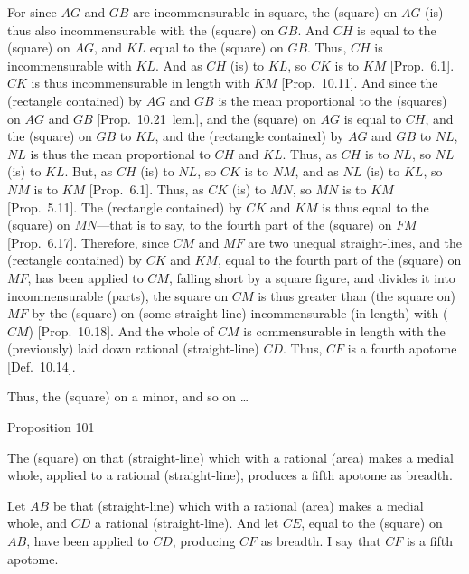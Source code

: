 For since $AG$ and $GB$ are incommensurable in square, the (square)
on $AG$ (is) thus also incommensurable with the (square) on $GB$.
And $CH$ is equal to the (square) on $AG$, and $KL$ equal to the (square) on $GB$. Thus, $CH$ is incommensurable with $KL$. And as $CH$ (is) to
$KL$, so $CK$ is to $KM$ [Prop.~6.1]. 
$CK$ is thus incommensurable in length with $KM$ [Prop.~10.11]. And since the (rectangle contained)
by $AG$ and $GB$ is the mean proportional to the (squares) on $AG$
and $GB$ [Prop.~10.21~lem.], and the
(square) on $AG$ is equal to $CH$, and the (square) on $GB$ to $KL$,
and the (rectangle contained) by $AG$ and $GB$ to $NL$, $NL$
is thus the mean proportional to $CH$ and $KL$. Thus, as $CH$
is to $NL$, so $NL$ (is) to $KL$. But, as $CH$ (is) to $NL$, so
$CK$ is to $NM$, and as $NL$ (is) to $KL$, so $NM$ is to $KM$ [Prop.~6.1]. Thus, as $CK$ (is) to $MN$, so
$MN$ is to $KM$ [Prop.~5.11]. The (rectangle
contained) by $CK$ and $KM$ is thus equal to the (square) on $MN$---that is to say, to the fourth part of the (square) on $FM$ [Prop.~6.17]. Therefore, since $CM$ and $MF$ are two unequal straight-lines, and the (rectangle contained) by $CK$ and
$KM$, equal to the fourth part of the (square) on $MF$, has been applied
to $CM$, falling short by a square figure, and divides it into incommensurable (parts), the square on $CM$ is thus greater than (the
square on) $MF$ by the (square) on (some straight-line) incommensurable
(in length) with ($CM$) [Prop.~10.18]. 
And the whole of $CM$ is commensurable in length with the (previously)
laid down rational (straight-line) $CD$. Thus, $CF$ is a fourth apotome
[Def.~10.14].

Thus, the (square) on a minor, and so on \ldots


\begin{center}
{\large Proposition 101}
\end{center}\vspace*{-7pt}

The (square) on that (straight-line) which
with a rational (area) makes a medial whole, applied to a rational (straight-line), produces a fifth apotome as breadth.

\epsfysize=1.6in
\centerline{}

Let $AB$ be that (straight-line) which with a rational (area) makes a
medial whole, and $CD$ a rational (straight-line). And let $CE$, equal
to the (square) on $AB$, have been applied to $CD$, producing $CF$
as breadth. I say that $CF$ is a fifth apotome.

